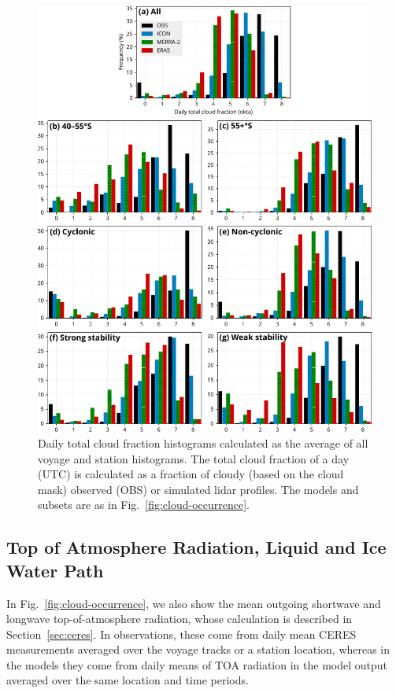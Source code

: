 \documentclass[draft]{agujournal2019}
\begin{document}
\begin{figure}[p!]
\centering
\includegraphics[width=\textwidth]{img/clt_hist_rev1.pdf}
\caption{
Daily total cloud fraction histograms calculated as the average of all voyage and station histograms. The total cloud fraction of a day (UTC) is calculated as a fraction of cloudy (based on the cloud mask) observed (OBS) or simulated lidar profiles. The models and subsets are as in Fig.~\ref{fig:cloud-occurrence}.
}
\label{fig:cloud-cover}
\end{figure}

\subsection{Top of Atmosphere Radiation, Liquid and Ice Water Path}
\label{sec:rad-lwp-iwp}

In Fig.~\ref{fig:cloud-occurrence}, we also show the mean outgoing shortwave and longwave top-of-atmosphere radiation, whose calculation is described in Section~\ref{sec:ceres}. In observations, these come from daily mean CERES measurements averaged over the voyage tracks or a station location, whereas in the models they come from daily means of TOA radiation in the model output averaged over the same location and time periods.
\end{document}
